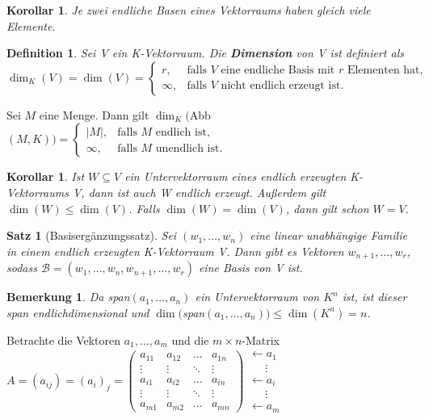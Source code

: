 \documentclass[12pt,a4paper]{article}
\theoremstyle{plain}
\newtheorem{Satz}[Theorem]{Satz}
\newtheorem{Korollar}[Theorem]{Korollar}
\newtheorem{Definition}[Theorem]{Definition}
\newtheorem{Bemerkung}[Theorem]{Bemerkung}
\newcommand{\herv}[1]{{\emph{\textbf{#1}}}}
\numberwithin{equation}{section}
\begin{document}
\begin{Korollar}
Je zwei endliche Basen eines Vektorraums haben gleich viele Elemente.
\end{Korollar}
\begin{Definition}
Sei V ein K-Vektorraum. Die \herv{Dimension} von V ist definiert als $\dim_K(V)=\dim(V)=\left\lbrace\begin{array}{ll} r,&\text{falls }V\text{ eine endliche Basis mit }r\text{ Elementen hat,}\\\infty,&\text{falls }V\text{ nicht endlich erzeugt ist.} \end{array}\right.$
\end{Definition}
Sei $M$ eine Menge. Dann gilt $\dim_K($Abb$(M,K))=\left\lbrace\begin{array}{ll}|M|,&\text{falls }M\text{ endlich ist,}\\ \infty,&\text{falls }M\text{ unendlich ist.}\end{array}\right.$
\begin{Korollar}
Ist $W\subseteq V$ ein Untervektorraum eines endlich erzeugten K-Vektorraums V, dann ist auch W endlich erzeugt. Außerdem gilt $\dim(W)\leq \dim(V)$. Falls $\dim(W)=\dim(V)$, dann gilt schon $W=V$.
\end{Korollar}
\begin{Satz}[Basisergänzungssatz]
Sei $(w_1,\ldots,w_n)$ eine linear unabhängige Familie in einem endlich erzeugten K-Vektorraum V. Dann gibt es Vektoren $w_{n+1},\ldots,w_r$, sodass $\mathcal{B}=(w_1,\ldots,w_n,w_{n+1},\ldots,w_r)$ eine Basis von V ist.
\end{Satz}
\begin{Bemerkung}
Da span$(a_1,\ldots,a_n)$ ein Untervektorraum von $K^n$ ist, ist dieser span endlichdimensional und $\dim($span$(a_1,\ldots,a_n))\leq \dim(K^n)=n$.
\end{Bemerkung}
Betrachte die Vektoren $a_1,\ldots,a_m$ und die $m\times n$-Matrix \\$A=(a_{ij})=(a_i)_j=\left(\begin{matrix}
a_{11} & a_{12} & \ldots & a_{1n}\\
\vdots & \vdots & \ddots & \vdots \\
a_{i1} & a_{i2} & \ldots & a_{in} \\
\vdots & \vdots & \ddots & \vdots \\
a_{m1} & a_{m2} & \ldots & a_{mn}
\end{matrix} \right) \begin{array}{l}
\gets a_1 \\
\quad ~~ \vdots\\
\gets a_i \\
\quad ~~\vdots\\
\gets a_m \end{array}$ \\
\end{document}
